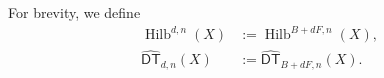 \documentclass{amsart}
\theoremstyle{definition}
\newcommand{\CC} {\mathbb{C}}          %
\newcommand{\ZZ} {\mathbb{Z}}		%
\renewcommand{\O}{\mathcal{O}}
\newcommand{\Hilb}{\operatorname{Hilb}}
\newcommand{\Tot}{\operatorname{Tot}}
\newcommand{\DT}{\mathsf{DT}}
\newcommand{\conn}{\operatorname{conn}}
\newcommand{\DThat}{\widehat{\DT}}
\begin{document}
\begin{comment}
Let $\beta = B+dF \in H_2(S)$. Denote by $X = \Tot(K_S)$ the total space of the canonical bundle over $S$. Then $X$ is a non-compact Calabi-Yau 3-fold. Consider the Hilbert scheme
$$
\Hilb^{\beta,n}(X) = \{ Z \subset X \ : \ [Z] = \beta, \ \chi(\O_Z) = n\}
$$
of proper subschemes $Z \subset X$ with fixed homology class and
holomorphic Euler characteristic. K.~Behrend associates to any
$\CC$-scheme of finite type $Y$ a constructible function $\nu : Y
\rightarrow \ZZ$ \cite{Behrend-micro}. Applied to $\Hilb^{\beta,n}(X)$, the
Donaldson-Thomas invariants of $X$ can be defined as\footnote{If $X$
is a \emph{compact} Calabi-Yau 3-fold, R.P.~Thomas's original
definition of the DT invariant is the degree of the virtual cycle of
$\Hilb^{\beta,n}(X)$ \cite{Tho}. Behrend showed this is the same as
$e(\Hilb^{\beta,n}(X),\nu)$ \cite{Behrend-micro}. The advantage of the
definition by means of virtual cycles is that the construction works
relative to a base. This implies deformation invariance of the
invariants.}
$$
\DT_{\beta,n}(X) := \int_{\Hilb^{\beta,n}(X)} \nu \, de := \sum_{k \in \ZZ} k \, e(\nu^{-1}(\{k\})),
$$
where $e(\cdot)$ denotes topological Euler characteristic. Many of the key properties of DT invariants are already captured by the more classical Euler characteristic version\footnote{From the point of view of \cite{JS, Bri}, there are two natural integration maps on the semi-classical Hall-algebra. One corresponds to weighing by the Behrend function. The other corresponds to weighing by the ``trivial'' constant constructible function 1. The former gives rise to $\DT(X)$ and the latter to $\DThat (X)$.}
$$
\DThat _{\beta,n}(X) := \int_{\Hilb^{\beta,n}(X)} 1 \, de = e(\Hilb^{\beta,n}(X)).
$$
\end{comment}


For brevity, we define
\begin{align*}
\Hilb^{d,n}(X) &:=\Hilb^{B+dF,n}(X), \\
\DThat _{d,n}(X) &:= \DThat_{B+dF,n}(X).
\end{align*}


\begin{comment}
The generating functions of interest are
\begin{align*}
\DT(X) &:= \sum_{d \geq 0} \DT_d(X) \, q^d := \sum_{d \geq 0} \sum_{n \in \ZZ} \DT_{d,n}(X) \, (-p)^n q^d, \\
\DThat (X) &:= \sum_{d \geq 0} \DThat _d(X) \, q^d := \sum_{d \geq 0} \sum_{n \in \ZZ} \DThat _{d,n}(X) \, p^n q^d.
\end{align*}
The corresponding connected series $\DT^{\conn}(X)$ and $\DThat ^{\conn}(X)$ are obtained after dividing by
\begin{align*}
&\sum_{d \geq 0} \sum_{n \in \ZZ} e(\Hilb^{dF,n}(X),\nu) \, (-p)^n q^d, \\
&\sum_{d \geq 0} \sum_{n \in \ZZ} e(\Hilb^{dF,n}(X)) \, p^n q^d,
\end{align*}
respectively.
\end{comment}
\end{document}
